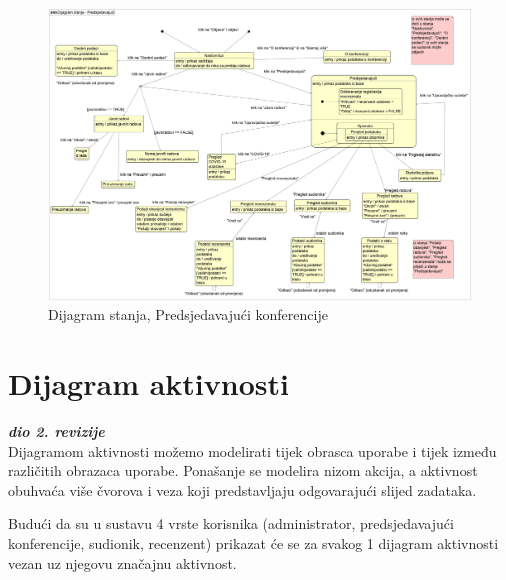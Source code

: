 			\begin{figure}[H]
				\includegraphics[height= 15 cm, width=15 cm]{dijagrami/Dijagram stanja - Predsjedavajuci.png} 
				\centering
				\caption{Dijagram stanja, Predsjedavajući konferencije}
				\label{fig:stanje4}
			\end{figure}
		
			
			
			
			
			
			
			
			\eject 
		
		\section{Dijagram aktivnosti}
			
			\textbf{\textit{dio 2. revizije}}\\
			
			 Dijagramom aktivnosti možemo modelirati tijek obrasca uporabe i tijek između različitih obrazaca uporabe. Ponašanje se modelira nizom akcija, a aktivnost obuhvaća više čvorova i veza koji predstavljaju odgovarajući slijed zadataka.
			 
			 Budući da su u sustavu 4 vrste korisnika (administrator, predsjedavajući konferencije, sudionik, recenzent) prikazat će se za svakog 1 dijagram aktivnosti vezan uz njegovu značajnu aktivnost.
			 
